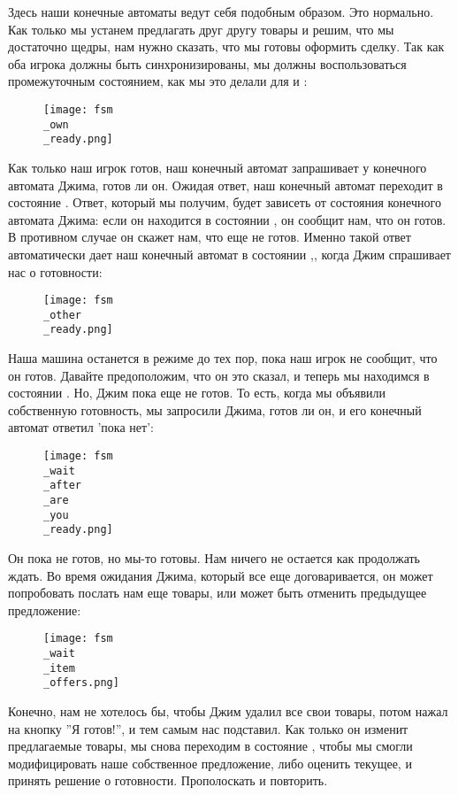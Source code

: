 Здесь наши конечные автоматы ведут себя подобным образом.
Это нормально.
Как только мы устанем предлагать друг другу товары и решим, что мы достаточно щедры, нам нужно сказать, что мы готовы оформить сделку.
Так как оба игрока должны быть синхронизированы, мы должны воспользоваться промежуточным состоянием, как мы это делали для  и :

\begin{figure}[h!]
    \centering
    \texttt{[image: fsm\\\_own\\\_ready.png]}
\end{figure}

Как только наш игрок готов, наш конечный автомат запрашивает у конечного автомата Джима, готов ли он.
Ожидая ответ, наш конечный автомат переходит в состояние .
Ответ, который мы получим, будет зависеть от состояния конечного автомата Джима: если он находится в состоянии , он сообщит нам, что он готов.
В противном случае он скажет нам, что еще не готов.
Именно такой ответ автоматически дает наш конечный автомат в состоянии ,, когда Джим спрашивает нас о готовности:

\begin{figure}[h!]
    \centering
    \texttt{[image: fsm\\\_other\\\_ready.png]}
\end{figure}

Наша машина останется в режиме  до тех пор, пока наш игрок не сообщит, что он готов.
Давайте предоположим, что он это сказал, и теперь мы находимся в состоянии .
Но, Джим пока еще не готов.
То есть, когда мы объявили собственную готовность, мы запросили Джима, готов ли он, и его конечный автомат ответил 'пока нет':

\begin{figure}[h!]
    \centering
    \texttt{[image: fsm\\\_wait\\\_after\\\_are\\\_you\\\_ready.png]}
\end{figure}

Он пока не готов, но мы\--то готовы.
Нам ничего не остается как продолжать ждать.
Во время ожидания Джима, который все еще договаривается, он может попробовать послать нам еще товары, или может быть отменить предыдущее предложение:

\begin{figure}[h!]
    \centering
    \texttt{[image: fsm\\\_wait\\\_item\\\_offers.png]}
\end{figure}

Конечно, нам не хотелось бы, чтобы Джим удалил все свои товары, потом нажал на кнопку ''Я готов!'', и тем самым нас подставил.
Как только он изменит предлагаемые товары, мы снова переходим в состояние , чтобы мы смогли модифицировать наше собственное предложение, либо оценить текущее, и принять решение о готовности.
Прополоскать и повторить.

